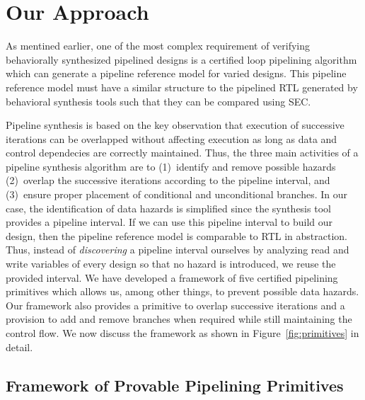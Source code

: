 \chapter{Our Approach}
\label{sec:pipelining-algorithm}

As mentined earlier, one of the most complex requirement of 
verifying behaviorally synthesized pipelined designs is a certified loop
pipelining algorithm which can generate a pipeline reference model
for varied designs. This pipeline reference model must have a similar structure to the pipelined RTL generated by behavioral synthesis tools such that they can be compared using SEC. 
  
Pipeline synthesis is based on the key observation that
execution of successive iterations can be overlapped without affecting 
execution as long
as data and control dependecies are correctly maintained. 
Thus, the three main
activities of a pipeline synthesis algorithm are to
(1)~identify and remove possible hazards (2)~overlap the
successive iterations according to the pipeline interval, and (3)~ensure proper placement of conditional and unconditional branches. In our case,
the identification of data hazards is simplified since the synthesis tool
provides a pipeline interval. If we can use this pipeline interval to build our design, then the pipeline reference model is comparable to RTL in abstraction. Thus, instead of {\em
discovering} a pipeline interval ourselves by analyzing read and write variables of every design so that no
hazard is introduced, we reuse the provided interval. 
We have developed a framework of five certified pipelining
primitives which allows us, among other things, to prevent possible data
hazards. Our framework also provides a primitive
to overlap successive iterations and a provision to add and remove branches when required while still maintaining the control flow. We now discuss
the framework as shown in Figure~\ref{fig:primitives}  in detail.

\section{Framework of Provable Pipelining Primitives}

